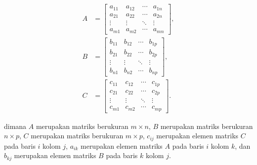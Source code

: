 \begin{align*}
  A & = \begin{bmatrix}a_{11}&a_{12}&\cdots&a_{1n}\\ a_{21}&a_{22}&\cdots&a_{2n}\\ \vdots&\vdots&\ddots&\vdots \\ a_{m1}&a_{m2}&\cdots&a_{mn}\end{bmatrix}, \\
  B & = \begin{bmatrix}b_{11}&b_{12}&\cdots&b_{1p}\\ b_{21}&b_{22}&\cdots&b_{2p}\\ \vdots&\vdots&\ddots&\vdots \\ b_{n1}&b_{n2}&\cdots&b_{np}\end{bmatrix}, \\
  C & = \begin{bmatrix}c_{11}&c_{12}&\cdots&c_{1p}\\ c_{21}&c_{22}&\cdots&c_{2p}\\ \vdots&\vdots&\ddots&\vdots \\ c_{m1}&c_{m2}&\cdots&c_{mp}\end{bmatrix}.
\end{align*}

\noindent
dimana $A$ merupakan matriks berukuran $m \times n$, $B$ merupakan matriks
berukuran $n \times p$, $C$ merupakan matriks berukuran $m \times p$, $c_{ij}$
merupakan elemen matriks $C$ pada baris $i$ kolom $j$, $a_{ik}$ merupakan elemen
matriks $A$ pada baris $i$ kolom $k$, dan $b_{kj}$ merupakan elemen matriks $B$
pada baris $k$ kolom $j$.

